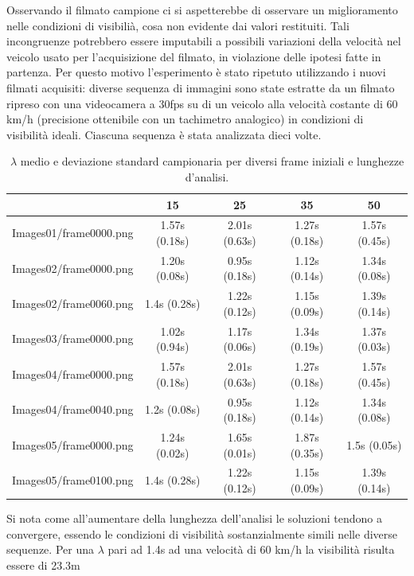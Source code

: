 \documentclass[12pt]{report}
\begin{document}
\noindent Osservando il filmato campione ci si aspetterebbe di osservare un miglioramento nelle condizioni di visibili\`a, cosa non evidente dai valori restituiti. Tali incongruenze potrebbero essere imputabili a possibili variazioni della velocit\`a nel veicolo usato per l'acquisizione del filmato, in violazione delle ipotesi fatte in partenza. Per questo motivo l'esperimento \`e stato ripetuto utilizzando i nuovi filmati acquisiti: diverse sequenza di immagini sono state estratte da un filmato ripreso con una videocamera a 30fps su di un veicolo alla velocit\`a costante di 60 km/h (precisione ottenibile con un tachimetro analogico) in condizioni di visibilit\`a ideali. Ciascuna sequenza \`e stata analizzata dieci volte.\\

\begin{table}[H]
\centering
\begin{tabular}{|c|c|c|c|c|}
	\hline
	& 15 & 25 & 35 & 50 \\ \hline
	Images01/frame0000.png & 1.57s (0.18s) & 2.01s (0.63s) & 1.27s (0.18s) & 1.57s (0.45s) \\ \hline
	Images02/frame0000.png & 1.20s (0.08s) & 0.95s (0.18s) & 1.12s (0.14s) & 1.34s (0.08s) \\ \hline
	Images02/frame0060.png & 1.4s (0.28s) & 1.22s (0.12s) & 1.15s (0.09s) & 1.39s (0.14s)\\ \hline
	Images03/frame0000.png & 1.02s (0.94s) & 1.17s (0.06s) & 1.34s (0.19s) & 1.37s (0.03s) \\ \hline
	Images04/frame0000.png & 1.57s (0.18s) & 2.01s (0.63s) & 1.27s (0.18s) & 1.57s (0.45s) \\ \hline
	Images04/frame0040.png & 1.2s (0.08s) & 0.95s (0.18s) & 1.12s (0.14s) & 1.34s (0.08s) \\ \hline
	Images05/frame0000.png & 1.24s (0.02s) & 1.65s (0.01s) & 1.87s (0.35s) & 1.5s (0.05s) \\ \hline
	Images05/frame0100.png & 1.4s (0.28s) & 1.22s (0.12s) & 1.15s (0.09s) & 1.39s (0.14s) \\ \hline
\end{tabular}
\caption{$\lambda$ medio e deviazione standard campionaria per diversi frame iniziali e lunghezze d'analisi.}
\end{table}

\noindent Si nota come all'aumentare della lunghezza dell'analisi le soluzioni tendono a convergere, essendo le condizioni di visibilit\`a sostanzialmente simili nelle diverse sequenze. Per una $\lambda$ pari ad 1.4s ad una velocit\`a di 60 km/h la visibilit\`a risulta essere di 23.3m\\
\end{document}
